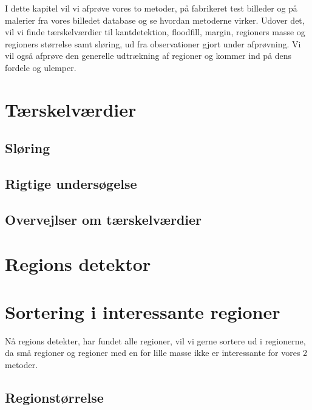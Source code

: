 {
{\sffamily
I dette kapitel vil vi afprøve vores to metoder, på fabrikeret test
billeder og på malerier fra vores billedet database og se hvordan
metoderne virker. Udover det, vil vi finde tærskelværdier til
kantdetektion, floodfill, margin, regioners masse og regioners størrelse
samt sløring, ud fra observationer gjort under afprøvning. Vi vil også
afprøve den generelle udtrækning af regioner og kommer ind på dens
fordele og ulemper.}

\section{Tærskelværdier\label{terskelverdi}}

\clearpage

\subsection{Sløring}

\clearpage

\subsection{Rigtige undersøgelse}


\subsection{Overvejlser om tærskelværdier}


\section{Regions detektor\label{region_detektor}}

\clearpage


\section{Sortering i interessante regioner}
{\sffamily 
Nå regions detekter, har fundet alle regioner, vil vi gerne sortere ud i
regionerne, da små regioner og regioner med en for lille masse ikke er
interessante for vores 2 metoder.
}


\subsection{Regionstørrelse \label{region_stoerlse}}

\clearpage

}
